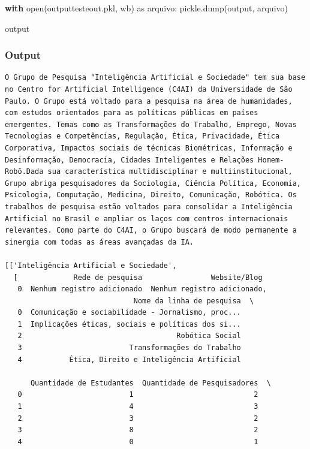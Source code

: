 \documentclass[
  brazilian,
  letterpaper,
  DIV=11,
  numbers=noendperiod]{scrartcl}
\newenvironment{Shaded}{\begin{snugshade}}{\end{snugshade}}
\newcommand{\BuiltInTok}[1]{\textcolor[rgb]{0.00,0.23,0.31}{#1}}
\newcommand{\ControlFlowTok}[1]{\textcolor[rgb]{0.00,0.23,0.31}{\textbf{#1}}}
\newcommand{\ImportTok}[1]{\textcolor[rgb]{0.00,0.46,0.62}{#1}}
\newcommand{\NormalTok}[1]{\textcolor[rgb]{0.00,0.23,0.31}{#1}}
\newcommand{\StringTok}[1]{\textcolor[rgb]{0.13,0.47,0.30}{#1}}
\begin{document}
\begin{Shaded}
\begin{Highlighting}[numbers=left,,]
\ControlFlowTok{with} \BuiltInTok{open}\NormalTok{(}\StringTok{\textquotesingle{}outputtesteout.pkl\textquotesingle{}}\NormalTok{, }\StringTok{\textquotesingle{}wb\textquotesingle{}}\NormalTok{) }\ImportTok{as}\NormalTok{ arquivo:}
\NormalTok{    pickle.dump(output, arquivo)}

\NormalTok{output}
\end{Highlighting}
\end{Shaded}

\subsubsection{Output}

\begin{verbatim}
O Grupo de Pesquisa "Inteligência Artificial e Sociedade" tem sua base no Centro for Artificial Intelligence (C4AI) da Universidade de São Paulo. O Grupo está voltado para a pesquisa na área de humanidades, com estudos orientados para as políticas públicas em países emergentes. Temas como as Transformações do Trabalho, Emprego, Novas Tecnologias e Competências, Regulação, Ética, Privacidade, Ética Corporativa, Impactos sociais de técnicas Biométricas, Informação e Desinformação, Democracia, Cidades Inteligentes e Relações Homem-Robô.Dada sua característica multidisciplinar e multiinstitucional, Grupo abriga pesquisadores da Sociologia, Ciência Política, Economia, Psicologia, Computação, Medicina, Direito, Comunicação, Robótica. Os trabalhos de pesquisa estão voltados para consolidar a Inteligência Artificial no Brasil e ampliar os laços com centros internacionais relevantes. Como parte do C4AI, o Grupo buscará de modo permanente a sinergia com todas as áreas avançadas da IA. 
            
[['Inteligência Artificial e Sociedade',
  [             Rede de pesquisa                Website/Blog
   0  Nenhum registro adicionado  Nenhum registro adicionado,
                              Nome da linha de pesquisa  \
   0  Comunicação e sociabilidade - Jornalismo, proc...   
   1  Implicações éticas, sociais e políticas dos si...   
   2                                    Robótica Social   
   3                         Transformações do Trabalho   
   4           Ética, Direito e Inteligência Artificial   
   
      Quantidade de Estudantes  Quantidade de Pesquisadores  \
   0                         1                            2   
   1                         4                            3   
   2                         3                            2   
   3                         8                            2   
   4                         0                            1   
   

\end{verbatim}
\end{document}
